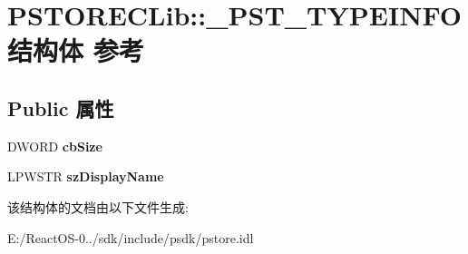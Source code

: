 \hypertarget{struct_p_s_t_o_r_e_c_lib_1_1___p_s_t___t_y_p_e_i_n_f_o}{}\section{P\+S\+T\+O\+R\+E\+C\+Lib\+:\+:\+\_\+\+P\+S\+T\+\_\+\+T\+Y\+P\+E\+I\+N\+F\+O结构体 参考}
\label{struct_p_s_t_o_r_e_c_lib_1_1___p_s_t___t_y_p_e_i_n_f_o}
\subsection*{Public 属性}
\begin{DoxyCompactItemize}
\item 
\mbox{\label{struct_p_s_t_o_r_e_c_lib_1_1___p_s_t___t_y_p_e_i_n_f_o_aa80034275604671cfdde7961bed70dbc}} 
D\+W\+O\+RD {\bfseries cb\+Size}
\item 
\mbox{\label{struct_p_s_t_o_r_e_c_lib_1_1___p_s_t___t_y_p_e_i_n_f_o_adc0683fbe8963d33a5c1b073f632cdd5}} 
L\+P\+W\+S\+TR {\bfseries sz\+Display\+Name}
\end{DoxyCompactItemize}


该结构体的文档由以下文件生成\+:\begin{DoxyCompactItemize}
\item 
E\+:/\+React\+O\+S-\/0../sdk/include/psdk/pstore.\+idl\end{DoxyCompactItemize}
